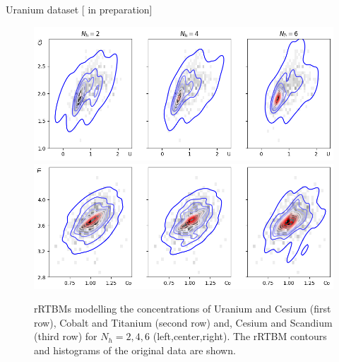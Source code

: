 \documentclass[10pt]{beamer}
\begin{document}
\begin{frame}{Uranium dataset \hfill \small [\cite{new} in preparation]}

    \begin{figure}
        \includegraphics[scale=0.5]{figures/uranium15.png}
        \includegraphics[scale=0.5]{figures/uranium37.png}

            \caption{rRTBMs modelling the concentrations of Uranium
            and Cesium (first row), Cobalt and Titanium (second row) and, Cesium and Scandium (third row) for $N_h = 2,4,6$ (left,center,right).
                 The rRTBM contours and histograms of the original data are shown.}
    \end{figure}
    
    
\end{frame}
\end{document}
